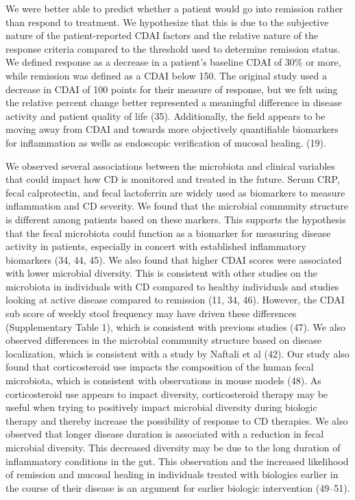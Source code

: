 \documentclass[12pt,]{article}
\begin{document}
We were better able to predict whether a patient would go into remission
rather than respond to treatment. We hypothesize that this is due to the
subjective nature of the patient-reported CDAI factors and the relative
nature of the response criteria compared to the threshold used to
determine remission status. We defined response as a decrease in a
patient's baseline CDAI of 30\% or more, while remission was defined as
a CDAI below 150. The original study used a decrease in CDAI of 100
points for their measure of response, but we felt using the relative
percent change better represented a meaningful difference in disease
activity and patient quality of life (35). Additionally, the field
appears to be moving away from CDAI and towards more objectively
quantifiable biomarkers for inflammation as wells as endoscopic
verification of mucosal healing. (19).

We observed several associations between the microbiota and clinical
variables that could impact how CD is monitored and treated in the
future. Serum CRP, fecal calprotectin, and fecal lactoferrin are widely
used as biomarkers to measure inflammation and CD severity. We found
that the microbial community structure is different among patients based
on these markers. This supports the hypothesis that the fecal microbiota
could function as a biomarker for measuring disease activity in
patients, especially in concert with established inflammatory biomarkers
(34, 44, 45). We also found that higher CDAI scores were associated with
lower microbial diversity. This is consistent with other studies on the
microbiota in individuals with CD compared to healthy individuals and
studies looking at active disease compared to remission (11, 34, 46).
However, the CDAI sub score of weekly stool frequency may have driven
these differences (Supplementary Table 1), which is consistent with
previous studies (47). We also observed differences in the microbial
community structure based on disease localization, which is consistent
with a study by Naftali et al (42). Our study also found that
corticosteroid use impacts the composition of the human fecal
microbiota, which is consistent with observations in mouse models (48).
As corticosteroid use appears to impact diversity, corticosteroid
therapy may be useful when trying to positively impact microbial
diversity during biologic therapy and thereby increase the possibility
of response to CD therapies. We also observed that longer disease
duration is associated with a reduction in fecal microbial diversity.
This decreased diversity may be due to the long duration of inflammatory
conditions in the gut. This observation and the increased likelihood of
remission and mucosal healing in individuals treated with biologics
earlier in the course of their disease is an argument for earlier
biologic intervention (49--51).
\end{document}
